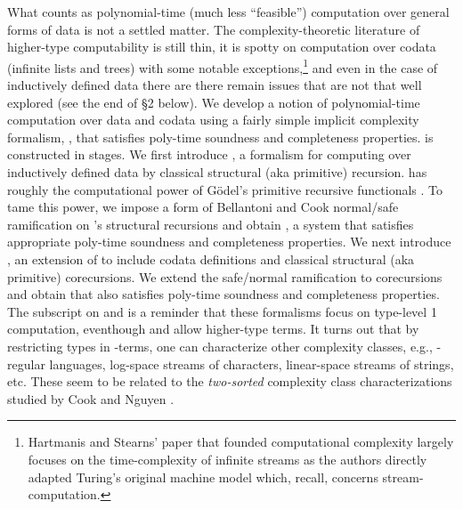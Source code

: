 \documentclass[envcountsame]{llncs}
\begin{document}
What counts as polynomial-time (much less ``feasible'') computation
over general forms of data is not a settled matter.  The
complexity-theoretic literature of higher-type computability is
still thin, it is  spotty on computation over codata (infinite
lists and trees) with some notable exceptions,\footnote{Hartmanis and Stearns' paper \cite{HartmanisStearns65} that
  founded computational complexity largely focuses on the
  time-complexity of infinite streams as the authors directly
  adapted Turing's original machine model \cite{Turing36}
  which, recall, concerns stream-computation.}  
and even in the case of inductively defined data there are there
remain issues that are not that well explored (see the end of \S2
below).  We develop a notion of polynomial-time computation over
data and codata using a fairly simple implicit complexity formalism,
, that satisfies poly-time soundness and completeness
properties.   is constructed in stages.  We first introduce 
, a formalism for computing over inductively defined data by
classical structural (aka primitive) recursion.   has roughly 
the computational power of G\"{o}del's primitive recursive
functionals \cite{Longley:notions:1}.  To tame this power, we impose
a form of Bellantoni and Cook normal/safe ramification on 's
structural recursions and obtain , a system that satisfies
appropriate poly-time soundness and completeness properties.  We
next introduce , an extension of 
to include codata definitions and
classical structural (aka primitive) corecursions.  We extend the
safe/normal ramification to corecursions and obtain  that
also satisfies  poly-time soundness and completeness
properties.  The subscript on  and  is a reminder
that these formalisms focus on type-level 1 computation, eventhough
 and  allow higher-type terms.  It turns out that by
restricting types in -terms, one can characterize other
complexity classes, e.g., -regular languages, log-space
streams of characters, linear-space streams of strings, etc.  These
seem to be related to the \emph{two-sorted} complexity class
characterizations studied by Cook and Nguyen \cite{CookNguyen:book}.
\end{document}
